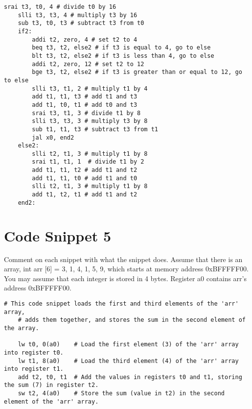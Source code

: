 \documentclass[12pt]{article}
\begin{document}
    \begin{lstlisting}[language=RISCV]
        srai t3, t0, 4 # divide t0 by 16
    slli t3, t3, 4 # multiply t3 by 16
    sub t3, t0, t3 # subtract t3 from t0
    if2:
        addi t2, zero, 4 # set t2 to 4
        beq t3, t2, else2 # if t3 is equal to 4, go to else
        blt t3, t2, else2 # if t3 is less than 4, go to else
        addi t2, zero, 12 # set t2 to 12
        bge t3, t2, else2 # if t3 is greater than or equal to 12, go to else
        slli t3, t1, 2 # multiply t1 by 4
        add t1, t1, t3 # add t1 and t3
        add t1, t0, t1 # add t0 and t3
        srai t3, t1, 3 # divide t1 by 8
        slli t3, t3, 3 # multiply t3 by 8
        sub t1, t1, t3 # subtract t3 from t1
        jal x0, end2
    else2:
        slli t2, t1, 3 # multiply t1 by 8
        srai t1, t1, 1  # divide t1 by 2
        add t1, t1, t2 # add t1 and t2
        add t1, t1, t0 # add t1 and t0
        slli t2, t1, 3 # multiply t1 by 8
        add t1, t2, t1 # add t1 and t2
    end2:
    \end{lstlisting}

    \newpage
    \section{Code Snippet 5}
        \begin{flushleft}
        Comment on each snippet with what the snippet does. Assume that there is an
        array, int arr [6] = {3, 1, 4, 1, 5, 9}, which starts at memory address
        0xBFFFFF00. You may assume that each integer is stored in 4 bytes. Register a0 contains
        arr's address 0xBFFFFF00.
    \end{flushleft}
    \begin{lstlisting}[language=RISCV]
# This code snippet loads the first and third elements of the 'arr' array, 
    # adds them together, and stores the sum in the second element of the array.
        
    lw t0, 0(a0)    # Load the first element (3) of the 'arr' array into register t0.
    lw t1, 8(a0)    # Load the third element (4) of the 'arr' array into register t1.
    add t2, t0, t1  # Add the values in registers t0 and t1, storing the sum (7) in register t2.
    sw t2, 4(a0)    # Store the sum (value in t2) in the second element of the 'arr' array.

    \end{lstlisting}
\end{document}
